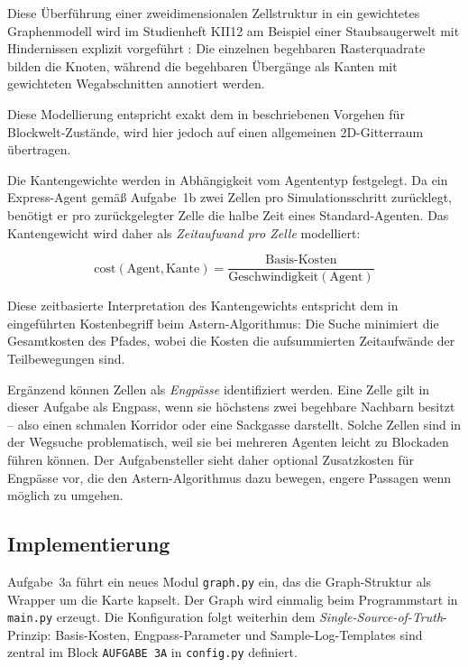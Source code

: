 Diese Überführung einer zweidimensionalen Zellstruktur in ein gewichtetes Graphenmodell wird im Studienheft KII12 am Beispiel einer Staubsaugerwelt mit Hindernissen explizit vorgeführt \cite[S. 20\,f., Abb.~1.6]{5}: Die einzelnen begehbaren Rasterquadrate bilden die Knoten, während die begehbaren Übergänge als Kanten mit gewichteten Wegabschnitten annotiert werden.

Diese Modellierung entspricht exakt dem in \textcite[S. 67\,ff.]{4} beschriebenen Vorgehen für Blockwelt-Zustände, wird hier jedoch auf einen allgemeinen \acs{2D}-Gitterraum übertragen.

Die Kantengewichte werden in Abhängigkeit vom Agententyp festgelegt. Da ein Express-Agent gemäß Aufgabe~1b zwei Zellen pro Simulationsschritt zurücklegt, benötigt er pro zurückgelegter Zelle die halbe Zeit eines Standard-Agenten. Das Kantengewicht wird daher als \textit{Zeitaufwand pro Zelle} modelliert:

\[
\text{cost}(\text{Agent}, \text{Kante}) = \frac{\text{Basis-Kosten}}{\text{Geschwindigkeit}(\text{Agent})}
\]

Diese zeitbasierte Interpretation des Kantengewichts entspricht dem in \textcite[S. 21\,ff.]{5} eingeführten Kostenbegriff beim \acs{Astern}-Algorithmus: Die Suche minimiert die Gesamtkosten des Pfades, wobei die Kosten die aufsummierten Zeitaufwände der Teilbewegungen sind.

Ergänzend können Zellen als \textit{Engpässe} identifiziert werden. Eine Zelle gilt in dieser Aufgabe als Engpass, wenn sie höchstens zwei begehbare Nachbarn besitzt -- also einen schmalen Korridor oder eine Sackgasse darstellt. Solche Zellen sind in der Wegsuche problematisch, weil sie bei mehreren Agenten leicht zu Blockaden führen können. Der Aufgabensteller sieht daher optional Zusatzkosten für Engpässe vor, die den \acs{Astern}-Algorithmus dazu bewegen, engere Passagen wenn möglich zu umgehen.

\subsection{Implementierung}

Aufgabe~3a führt ein neues Modul \texttt{graph.py} ein, das die Graph-Struktur als Wrapper um die Karte kapselt. Der Graph wird einmalig beim Programmstart in \texttt{main.py} erzeugt. Die Konfiguration folgt weiterhin dem \textit{Single-Source-of-Truth}-Prinzip: Basis-Kosten, Engpass-Parameter und Sample-Log-Templates sind zentral im Block \texttt{AUFGABE 3A} in \texttt{config.py} definiert.

